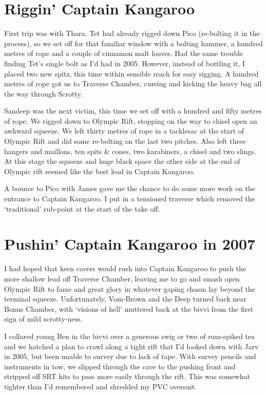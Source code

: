 
\section{Riggin' Captain Kangaroo}\label{riggin-captain-kangaroo}

First trip was with Thara. Tet had already rigged down Pico (re-bolting
it in the process), so we set off for that familiar window with a
bolting hammer, a hundred metres of rope and a couple of cinnamon malt
loaves. Had the same trouble finding Tet's single bolt as I'd had in
2005. However, instead of bottling it, I placed two new spitz, this time
within sensible reach for easy rigging. A hundred metres of rope got us
to Traverse Chamber, cursing and kicking the heavy bag all the way
through Scrotty.

Sandeep was the next victim, this time we set off with a hundred and
fifty metres of rope. We rigged down to Olympic Rift, stopping on the
way to chisel open an awkward squeeze. We left thirty metres of rope in
a tacklesac at the start of Olympic Rift and did some re-bolting on the
last two pitches. Also left three hangers and maillons, ten spits \&
cones, two karabiners, a chisel and two slings. At this stage the
squeeze and huge black space the other side at the end of Olympic rift
seemed like the best lead in Captain Kangaroo.

A bounce to Pico with James gave me the chance to do some more work on
the entrance to Captain Kangaroo. I put in a tensioned traverse which
removed the `traditional' rub-point at the start of the take off.


\section{Pushin' Captain Kangaroo in
2007}\label{pushin-captain-kangaroo-in-2007}

I had hoped that keen cavers would rush into Captain Kangaroo to push
the more shallow lead off Traverse Chamber, leaving me to go and smash
open Olympic Rift to fame and great glory in whatever gaping chasm lay
beyond the terminal squeeze. Unfortunately, Vom-Brown and the Deep
turned back near Bonus Chamber, with `visions of hell' muttered back at
the bivvi from the first sign of mild scrotty-ness.

I collared young Ben in the bivvi over a generous swig or two of
rum-spiked tea and we hatched a plan to crawl along a tight rift that
I'd looked down with Jarv in 2005, but been unable to survey due to lack
of tape. With survey pencils and instruments in tow, we slipped through
the cave to the pushing front and stripped off SRT kits to pass more
easily through the rift. This was somewhat tighter than I'd remembered
and shredded my PVC oversuit.

